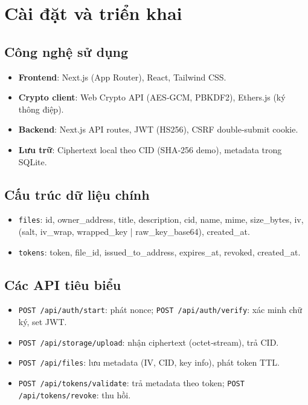 \chapter{Cài đặt và triển khai}

\section{Công nghệ sử dụng}
\begin{itemize}
  \item \textbf{Frontend}: Next.js (App Router), React, Tailwind CSS.
  \item \textbf{Crypto client}: Web Crypto API (AES‑GCM, PBKDF2), Ethers.js (ký thông điệp).
  \item \textbf{Backend}: Next.js API routes, JWT (HS256), CSRF double‑submit cookie.
  \item \textbf{Lưu trữ}: Ciphertext local theo CID (SHA‑256 demo), metadata trong SQLite.
\end{itemize}

\section{Cấu trúc dữ liệu chính}
\begin{itemize}
  \item \texttt{files}: id, owner\_address, title, description, cid, name, mime, size\_bytes, iv, (salt, iv\_wrap, wrapped\_key | raw\_key\_base64), created\_at.
  \item \texttt{tokens}: token, file\_id, issued\_to\_address, expires\_at, revoked, created\_at.
\end{itemize}

\section{Các API tiêu biểu}
\begin{itemize}
  \item \texttt{POST /api/auth/start}: phát nonce; \texttt{POST /api/auth/verify}: xác minh chữ ký, set JWT.
  \item \texttt{POST /api/storage/upload}: nhận ciphertext (octet‑stream), trả CID.
  \item \texttt{POST /api/files}: lưu metadata (IV, CID, key info), phát token TTL.
  \item \texttt{POST /api/tokens/validate}: trả metadata theo token; \texttt{POST /api/tokens/revoke}: thu hồi.
\end{itemize}

